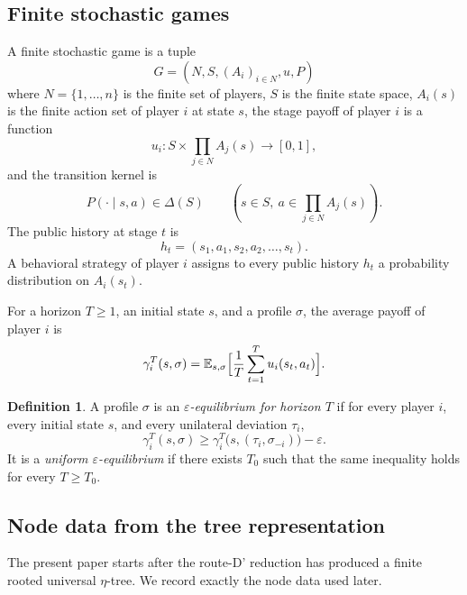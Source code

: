 \documentclass[12pt]{article}
\theoremstyle{definition}
\newtheorem{definition}[theorem]{Definition}
\newcommand{\eps}{\varepsilon}
\newcommand{\E}{\mathbb{E}}
\newcommand{\1}{\mathbf{1}}
\begin{document}
\subsection{Finite stochastic games}

A finite stochastic game is a tuple
\[
G=(N,S,(A_i)_{i\in N},u,P)
\]
where $N=\{1,\dots,n\}$ is the finite set of players, $S$ is the finite state
space, $A_i(s)$ is the finite action set of player $i$ at state $s$, the stage
payoff of player $i$ is a function
\[
u_i:S\times \prod_{j\in N}A_j(s)\to [0,1],
\]
and the transition kernel is
\[
P(\cdot\mid s,a)\in \Delta(S)
\qquad (s\in S,\ a\in \prod_{j\in N}A_j(s)).
\]
The public history at stage $t$ is
\[
h_t=(s_1,a_1,s_2,a_2,\dots,s_t).
\]
A behavioral strategy of player $i$ assigns to every public history $h_t$ a
probability distribution on $A_i(s_t)$.

For a horizon $T\ge 1$, an initial state $s$, and a profile $\sigma$, the average
payoff of player $i$ is
\[
\gamma_i^T(s,\sigma)
=
\E_{s,\sigma}\Bigl[\frac1T\sum_{t=1}^T u_i(s_t,a_t)\Bigr].
\]

\begin{definition}
A profile $\sigma$ is an \emph{$\eps$-equilibrium for horizon $T$} if for every
player $i$, every initial state $s$, and every unilateral deviation $\tau_i$,
\[
\gamma_i^T(s,\sigma)
\ge
\gamma_i^T\bigl(s,(\tau_i,\sigma_{-i})\bigr)-\eps.
\]
It is a \emph{uniform $\eps$-equilibrium} if there exists $T_0$ such that the same
inequality holds for every $T\ge T_0$.
\end{definition}

\subsection{Node data from the tree representation}

The present paper starts after the route-D' reduction has produced a finite rooted
universal $\eta$-tree.  We record exactly the node data used later.
\end{document}
